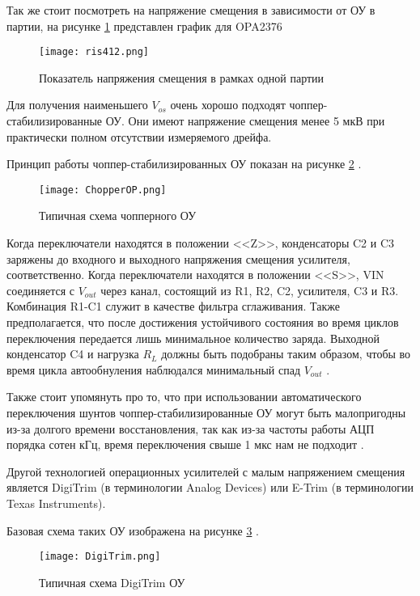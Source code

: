 Так же стоит посмотреть на напряжение смещения в зависимости от ОУ в партии, 
на рисунке \ref{ris:412} представлен график для OPA2376 \cite{OPAx376:datasheet}

\begin{figure}[H]
\centering
\texttt{[image: ris412.png]}
\caption{Показатель напряжения смещения в рамках одной партии}
\label{ris:412}
\end{figure}

Для получения наименьшего $V_{os}$ очень хорошо подходят чоппер-стабилизированные ОУ. Они имеют напряжение 
смещения менее 5 мкВ при практически полном отсутствии измеряемого дрейфа. 

Принцип работы чоппер-стабилизированных ОУ показан на рисунке \ref{ris:ChopperOP} \cite{MT-055:Tutorial}.

\begin{figure}[H]
\centering
\texttt{[image: ChopperOP.png]}
\caption{Типичная схема чопперного ОУ}
\label{ris:ChopperOP}
\end{figure}


Когда переключатели находятся в положении <<Z>>, конденсаторы C2 и C3 заряжены до входного и выходного
напряжения смещения усилителя, соответственно. Когда переключатели находятся в положении <<S>>, 
VIN соединяется с $V_{out}$ через канал, состоящий из R1, R2, C2, усилителя, C3 и R3. Комбинация R1-C1 служит в 
качестве фильтра сглаживания. Также предполагается, что после достижения устойчивого состояния во время 
циклов переключения передается лишь минимальное количество заряда. Выходной конденсатор C4 и нагрузка $R_{L}$ 
должны быть подобраны таким образом, чтобы во время цикла автообнуления наблюдался минимальный спад $V_{out}$ 
\cite{MT-055:Tutorial}.

Также стоит упомянуть про то, что при использовании автоматического переключения шунтов 
чоппер-стабилизированные ОУ могут быть малопригодны из-за долгого времени восстановления, 
так как из-за частоты работы
АЦП порядка сотен кГц, время переключения свыше 1 мкс нам не подходит \cite{Chopper:OU}.

Другой технологией операционных усилителей с малым напряжением смещения является DigiTrim (в терминологии Analog 
Devices) или E-Trim (в терминологии Texas Instruments).

Базовая схема таких ОУ изображена на рисунке \ref{ris:DigiTrim} \cite{MT-037:Tutorial}.

\begin{figure}[H]
\centering
\texttt{[image: DigiTrim.png]}
\caption{Типичная схема DigiTrim ОУ}
\label{ris:DigiTrim}
\end{figure}

